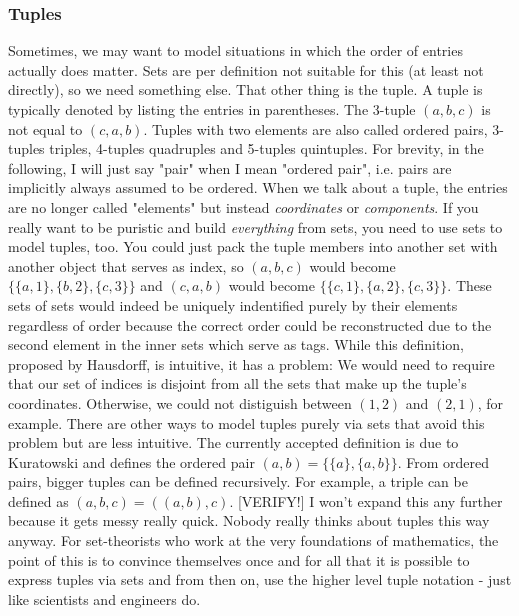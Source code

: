 

\subsubsection{Tuples}
Sometimes, we may want to model situations in which the order of entries actually does matter. Sets are per definition not suitable for this (at least not directly), so we need something else. That other thing is the tuple. A tuple is typically denoted by listing the entries in parentheses. The 3-tuple $(a,b,c)$ is not equal to $(c,a,b)$. Tuples with two elements are also called ordered pairs, 3-tuples triples, 4-tuples quadruples and 5-tuples quintuples. For brevity, in the following, I will just say "pair" when I mean "ordered pair", i.e. pairs are implicitly always assumed to be ordered. When we talk about a tuple, the entries are no longer called "elements" but instead \emph{coordinates} or \emph{components}. If you really want to be puristic and build \emph{everything} from sets, you need to use sets to model tuples, too. You could just pack the tuple members into another set with another object that serves as index, so $(a,b,c)$ would become $\{\{a,1\},\{b,2\},\{c,3\}\}$ and $(c,a,b)$ would become  $\{\{c,1\},\{a,2\},\{c,3\}\}$. These sets of sets would indeed be uniquely indentified purely by their elements regardless of order because the correct order could be reconstructed due to the second element in the inner sets which serve as tags. While this definition, proposed by Hausdorff, is intuitive, it has a problem: We would need to require that our set of indices is disjoint from all the sets that make up the tuple's coordinates. Otherwise, we could not distiguish between $(1,2)$ and $(2,1)$, for example. There are other ways to model tuples purely via sets that avoid this problem but are less intuitive. The currently accepted definition is due to Kuratowski and defines the ordered pair $(a,b) = \{ \{a\}, \{a,b\} \}$. From ordered pairs, bigger tuples can be defined recursively. For example, a triple can be defined as $(a,b,c) = ((a,b),c)$. [VERIFY!] I won't expand this any further because it gets messy really quick. Nobody really thinks about tuples this way anyway. For set-theorists who work at the very foundations of mathematics, the point of this is to convince themselves once and for all that it is possible to express tuples via sets and from then on, use the higher level tuple notation - just like scientists and engineers do. 

